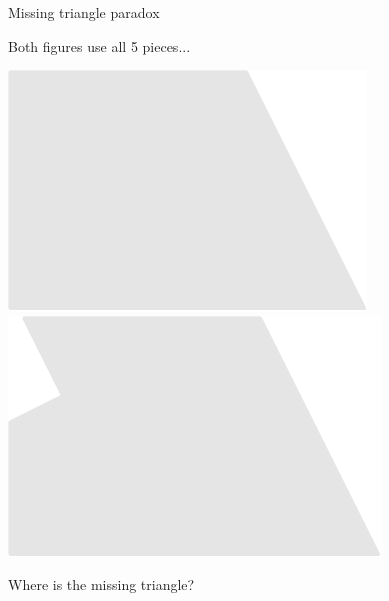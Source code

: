 \documentclass[14pt]{beamer}
\begin{document}

    \begin{frame}{Missing triangle paradox}
        \begin{center}
            Both figures use all 5 pieces...

            \vspace{36pt}

            \;\;\includegraphics[scale=0.5]{figures/figure022c.pdf}\qquad
            \qquad
            \includegraphics[scale=0.5]{figures/figure026bg.pdf}\;\;\,

            \vspace{32pt}

            Where is the missing triangle?
        \end{center}
    \end{frame}
\end{document}
